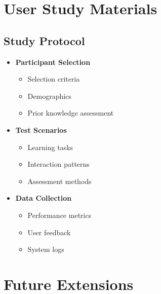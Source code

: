 \section{User Study Materials}
\label{sec:user-study}

\subsection{Study Protocol}
\begin{itemize}
    \item \textbf{Participant Selection}
        \begin{itemize}
            \item Selection criteria
            \item Demographics
            \item Prior knowledge assessment
        \end{itemize}
    
    \item \textbf{Test Scenarios}
        \begin{itemize}
            \item Learning tasks
            \item Interaction patterns
            \item Assessment methods
        \end{itemize}
    
    \item \textbf{Data Collection}
        \begin{itemize}
            \item Performance metrics
            \item User feedback
            \item System logs
        \end{itemize}
\end{itemize}

\section{Future Extensions}
\label{sec:future-extensions}

